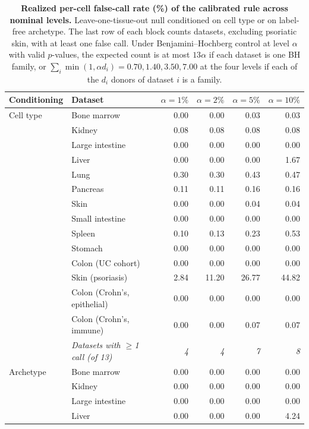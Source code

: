 \begin{table}[htbp]
\centering
\caption{\textbf{Realized per-cell false-call rate (\%) of the calibrated rule across nominal levels.} Leave-one-tissue-out null conditioned on cell type or on label-free archetype. The last row of each block counts datasets, excluding psoriatic skin, with at least one false call. Under Benjamini--Hochberg control at level $\alpha$ with valid $p$-values, the expected count is at most $13\alpha$ if each dataset is one BH family, or $\sum_i \min(1, \alpha d_i) = 0.70, 1.40, 3.50, 7.00$ at the four levels if each of the $d_i$ donors of dataset $i$ is a family.}
\label{tab:s4}
\scriptsize
\begin{tabular}{@{}llrrrr@{}}
\toprule
Conditioning & Dataset & $\alpha=1\%$ & $\alpha=2\%$ & $\alpha=5\%$ & $\alpha=10\%$ \\
\midrule
Cell type & Bone marrow & 0.00 & 0.00 & 0.03 & 0.03 \\
 & Kidney & 0.08 & 0.08 & 0.08 & 0.08 \\
 & Large intestine & 0.00 & 0.00 & 0.00 & 0.00 \\
 & Liver & 0.00 & 0.00 & 0.00 & 1.67 \\
 & Lung & 0.30 & 0.30 & 0.43 & 0.47 \\
 & Pancreas & 0.11 & 0.11 & 0.16 & 0.16 \\
 & Skin & 0.00 & 0.00 & 0.04 & 0.04 \\
 & Small intestine & 0.00 & 0.00 & 0.00 & 0.00 \\
 & Spleen & 0.10 & 0.13 & 0.23 & 0.53 \\
 & Stomach & 0.00 & 0.00 & 0.00 & 0.00 \\
 & Colon (UC cohort) & 0.00 & 0.00 & 0.00 & 0.00 \\
 & Skin (psoriasis) & 2.84 & 11.20 & 26.77 & 44.82 \\
 & Colon (Crohn's, epithelial) & 0.00 & 0.00 & 0.00 & 0.00 \\
 & Colon (Crohn's, immune) & 0.00 & 0.00 & 0.07 & 0.07 \\
 & \textit{Datasets with $\geq$1 call (of 13)} & \textit{4} & \textit{4} & \textit{7} & \textit{8} \\
\midrule
Archetype & Bone marrow & 0.00 & 0.00 & 0.00 & 0.00 \\
 & Kidney & 0.00 & 0.00 & 0.00 & 0.00 \\
 & Large intestine & 0.00 & 0.00 & 0.00 & 0.00 \\
 & Liver & 0.00 & 0.00 & 0.00 & 4.24 \\

\end{tabular}
\end{table}
